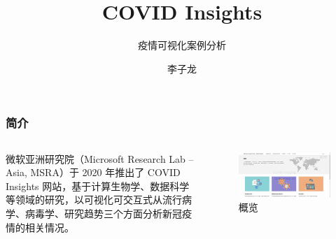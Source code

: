 \documentclass[UTF8,aspectratio=169]{ctexbeamer}
\begin{document}
    \title{COVID Insights}
    \subtitle{疫情可视化案例分析}
    \author{李子龙}
    \maketitle

    \begin{frame}
        \frametitle{简介}
        \begin{columns}
            \begin{column}{0.4\textwidth}
        微软亚洲研究院（Microsoft Research Lab -- Asia, MSRA）于 2020 年推出了 COVID Insights 网站\footnotemark，基于计算生物学、数据科学等领域的研究，以可视化可交互式从流行病学、病毒学、研究趋势三个方面分析新冠疫情的相关情况。
            \end{column}
            \begin{column}{0.6\textwidth}
                \begin{figure}[H]
                    \includegraphics[width=\linewidth]{intro}
                \caption{概览\cite{msracn}}\label{fig:intro}
                \end{figure}
            \end{column}
        \end{columns}
    \end{frame}
\end{document}
